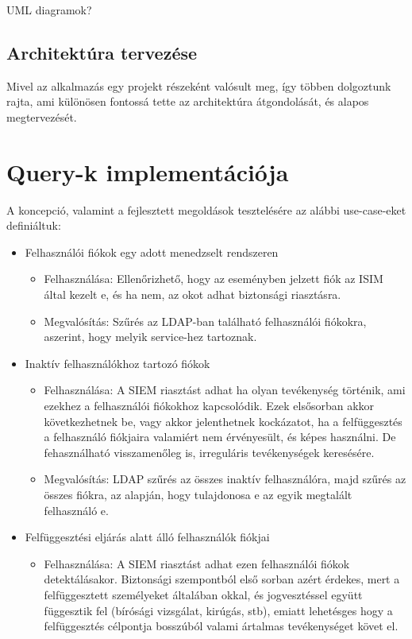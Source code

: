 \todo UML diagramok?
\subsection{Architektúra tervezése}

Mivel az alkalmazás egy projekt részeként valósult meg, így többen dolgoztunk rajta, ami különösen fontossá tette az architektúra átgondolását, és alapos megtervezését. 

\section{Query-k implementációja} \label{sec:queryk}
A koncepció, valamint a fejlesztett megoldások tesztelésére az alábbi use-case-eket definiáltuk:

\begin{itemize}
	\item Felhasználói fiókok egy adott menedzselt rendszeren
	\begin{itemize}
		\small
		\item Felhasználása: Ellenőrizhető, hogy az eseményben jelzett fiók az ISIM által kezelt e, és ha nem, az okot adhat biztonsági riasztásra.
		\item Megvalósítás: Szűrés az LDAP-ban található felhasználói fiókokra, aszerint, hogy melyik service-hez tartoznak.
	\end{itemize} 
	\item Inaktív felhasználókhoz tartozó fiókok
	\begin{itemize}
		\small
		\item Felhasználása: A SIEM riasztást adhat ha olyan tevékenység történik, ami ezekhez a felhasználói fiókokhoz kapcsolódik. Ezek elsősorban akkor következhetnek be, vagy akkor jelenthetnek kockázatot, ha a felfüggesztés a felhasználó fiókjaira valamiért nem érvényesült, és képes használni. De fehasználható visszamenőleg is, irreguláris tevékenységek keresésére.
		\item Megvalósítás: LDAP szűrés az összes inaktív felhasználóra, majd szűrés az összes fiókra, az alapján, hogy tulajdonosa e az egyik megtalált felhasználó e.
	\end{itemize}
	\item Felfüggesztési eljárás alatt álló felhasználók fiókjai
	\begin{itemize}
		\small
		\item Felhasználása: A SIEM riasztást adhat ezen felhasználói fiókok detektálásakor. Biztonsági szempontból első sorban azért érdekes, mert a felfüggesztett személyeket általában okkal, és jogvesztéssel együtt függesztik fel (bírósági vizsgálat, kirúgás, stb), emiatt lehetésges hogy a felfüggesztés célpontja bosszúból valami ártalmas tevékenységet követ el.

\end{itemize}
\end{itemize}
